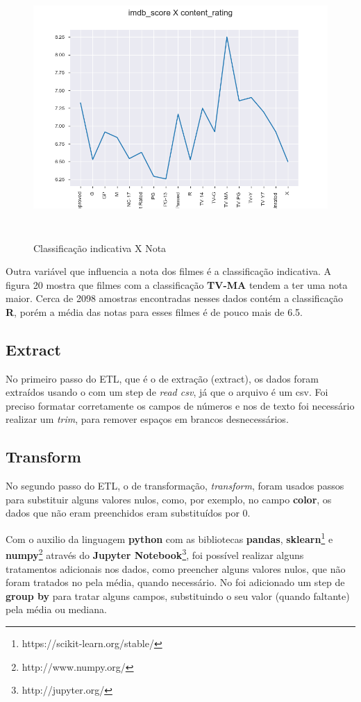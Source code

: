 \begin{figure}[H]
\centering
\includegraphics[height=10cm]{imagens/scoreXcontent.png}
\caption{Classificação indicativa X Nota}
\label{figura 27}
\end{figure}
Outra variável que influencia a nota dos filmes é a classificação indicativa. A figura 20 mostra que filmes com a classificação \textbf{TV-MA} tendem a ter uma nota maior. Cerca de 2098 amostras encontradas nesses dados contém a classificação \textbf{R}, porém a média das notas para esses filmes é de pouco mais de 6.5.

\subsection{Extract}
No primeiro passo do ETL, que é o de extração (extract), os dados foram extraídos usando o \pdi com um step de \textit{read csv}, já que o arquivo é um csv. Foi preciso formatar corretamente os campos de números e nos de texto foi necessário realizar um \textit{trim}, para remover espaços em brancos desnecessários. 

\subsection{Transform}
No segundo passo do ETL, o de transformação, \textit{transform}, foram usados passos para substituir alguns valores nulos, como, por exemplo, no campo \textbf{color}, os dados que não eram preenchidos eram substituídos por 0. 

Com o auxilio da linguagem \textbf{python} com as bibliotecas \textbf{pandas}, \textbf{sklearn}\footnote{https://scikit-learn.org/stable/} e \textbf{numpy}\footnote{http://www.numpy.org/} através do \textbf{Jupyter Notebook}\footnote{http://jupyter.org/}, foi possível realizar alguns tratamentos adicionais nos dados, como preencher alguns valores nulos, que não foram tratados no \pdi pela média, quando necessário. No \pdi foi adicionado um step de \textbf{group by} para tratar alguns campos, substituindo o seu valor (quando faltante) pela média ou mediana. 

